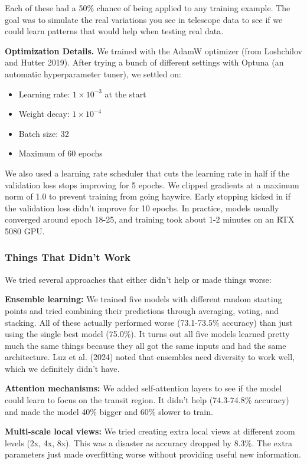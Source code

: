 \documentclass[letterpaper]{article} %
\begin{document}
Each of these had a 50\% chance of being applied to any training example. The goal was to simulate the real variations you see in telescope data to see if we could learn patterns that would help when testing real data.

\textbf{Optimization Details.} We trained with the AdamW optimizer (from Loshchilov and Hutter 2019). After trying a bunch of different settings with Optuna (an automatic hyperparameter tuner), we settled on:
\begin{itemize}
    \item Learning rate: $1 \times 10^{-3}$ at the start
    \item Weight decay: $1 \times 10^{-4}$
    \item Batch size: 32
    \item Maximum of 60 epochs
\end{itemize}

We also used a learning rate scheduler that cuts the learning rate in half if the validation loss stops improving for 5 epochs. We clipped gradients at a maximum norm of 1.0 to prevent training from going haywire. Early stopping kicked in if the validation loss didn't improve for 10 epochs. In practice, models usually converged around epoch 18-25, and training took about 1-2 minutes on an RTX 5080 GPU.

\subsubsection{Things That Didn't Work}

We tried several approaches that either didn't help or made things worse:

\textbf{Ensemble learning:} We trained five models with different random starting points and tried combining their predictions through averaging, voting, and stacking. All of these actually performed worse (73.1-73.5\% accuracy) than just using the single best model (75.0\%). It turns out all five models learned pretty much the same things because they all got the same inputs and had the same architecture. Luz et al. (2024) noted that ensembles need diversity to work well, which we definitely didn't have.

\textbf{Attention mechanisms:} We added self-attention layers to see if the model could learn to focus on the transit region. It didn't help (74.3-74.8\% accuracy) and made the model 40\% bigger and 60\% slower to train.

\textbf{Multi-scale local views:} We tried creating extra local views at different zoom levels (2x, 4x, 8x). This was a disaster as accuracy dropped by 8.3\%. The extra parameters just made overfitting worse without providing useful new information.
\end{document}

